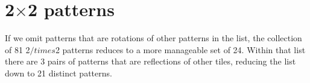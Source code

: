 \chapter{2$\times$2 patterns}

If we omit patterns that are rotations of other patterns in the list, the collection of 81 2$/times$2 patterns reduces to a more manageable set of 24. Within that list there are 3 pairs of patterns that are reflections of other tiles, reducing the list down to 21 distinct patterns.

\vspace{1cm}



